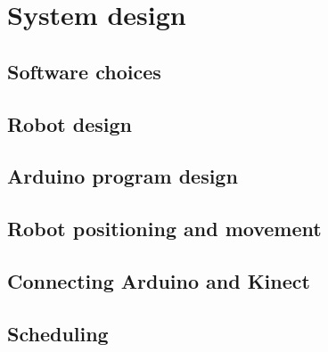\chapter{System design}
\label{chap:System design}


\section{Software choices}
\label{sec:Software choices}

\section{Robot design}
\label{sec:Robot design}

\section{Arduino program design}
\label{sec:Arduino program design}

\section{Robot positioning and movement}
\label{sec:Robot positioning and movement}

\section{Connecting Arduino and Kinect}
\label{sec:Connecting Arduino and Kinect}

\section{Scheduling}
\label{sec:Scheduling}

